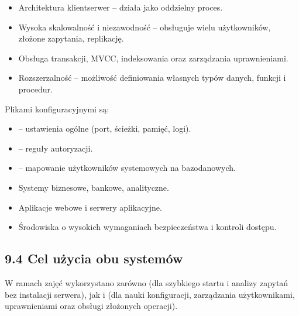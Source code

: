 \documentclass[a4paper,11pt,polish]{sphinxmanual}
\begin{document}
\sphinxAtStartPar
{}
\begin{itemize}
\item {} 
\sphinxAtStartPar
Architektura klient\sphinxhyphen{}serwer – działa jako oddzielny proces.

\item {} 
\sphinxAtStartPar
Wysoka skalowalność i niezawodność – obsługuje wielu użytkowników, złożone zapytania, replikację.

\item {} 
\sphinxAtStartPar
Obsługa transakcji, MVCC, indeksowania oraz zarządzania uprawnieniami.

\item {} 
\sphinxAtStartPar
Rozszerzalność – możliwość definiowania własnych typów danych, funkcji i procedur.

\end{itemize}

\sphinxAtStartPar
{}
Plikami konfiguracyjnymi są:
\begin{itemize}
\item {} 
\sphinxAtStartPar
{} – ustawienia ogólne (port, ścieżki, pamięć, logi).

\item {} 
\sphinxAtStartPar
{} – reguły autoryzacji.

\item {} 
\sphinxAtStartPar
{} – mapowanie użytkowników systemowych na bazodanowych.

\end{itemize}

\sphinxAtStartPar
{}
\begin{itemize}
\item {} 
\sphinxAtStartPar
Systemy biznesowe, bankowe, analityczne.

\item {} 
\sphinxAtStartPar
Aplikacje webowe i serwery aplikacyjne.

\item {} 
\sphinxAtStartPar
Środowiska o wysokich wymaganiach bezpieczeństwa i kontroli dostępu.

\end{itemize}


\subsection{9.4 Cel użycia obu systemów}
\label{\detokenize{Konfiguracja_baz_danych/Konfiguracja_baz_danych:cel-uzycia-obu-systemow}}
\sphinxAtStartPar
W ramach zajęć wykorzystano zarówno  (dla szybkiego startu i analizy zapytań bez instalacji serwera), jak i  (dla nauki konfiguracji, zarządzania użytkownikami, uprawnieniami oraz obsługi złożonych operacji).
\end{document}
